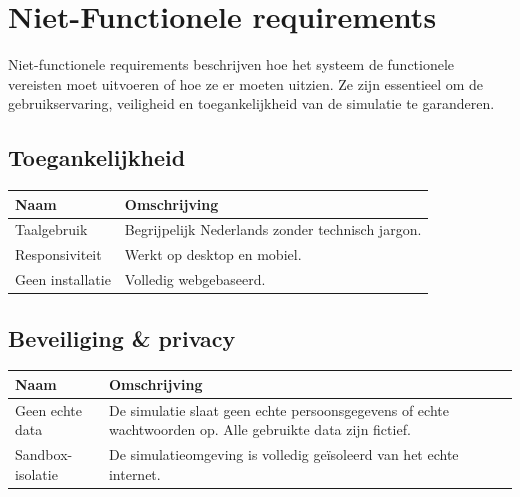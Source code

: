 \section{Niet-Functionele requirements}
Niet-functionele requirements beschrijven hoe het systeem de functionele vereisten moet uitvoeren of hoe ze er moeten uitzien. Ze zijn essentieel om de gebruikservaring, veiligheid en toegankelijkheid van de simulatie te garanderen.

\subsection{Toegankelijkheid}

\begin{table}[H]
\centering
\begin{tabularx}{\textwidth}{l X}
\toprule
\textbf{Naam} & \textbf{Omschrijving} \\
\midrule

Taalgebruik & Begrijpelijk Nederlands zonder technisch jargon. \\

Responsiviteit & Werkt op desktop en mobiel. \\

Geen installatie & Volledig webgebaseerd. \\

\bottomrule
\end{tabularx}
\end{table}

\subsection{Beveiliging \& privacy}

\begin{table}[H]
\centering
\begin{tabularx}{\textwidth}{l X}
\toprule
\textbf{Naam} & \textbf{Omschrijving} \\
\midrule

Geen echte data & De simulatie slaat geen echte persoonsgegevens of echte wachtwoorden op. Alle gebruikte data zijn fictief. \\

Sandbox-isolatie & De simulatieomgeving is volledig geïsoleerd van het echte internet. \\

\bottomrule
\end{tabularx}
\end{table}

